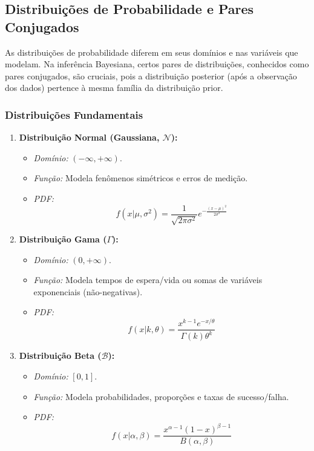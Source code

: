 \documentclass{article}
\begin{document}
\subsection{Distribuições de Probabilidade e Pares Conjugados}

As distribuições de probabilidade diferem em seus domínios e nas variáveis que modelam. Na inferência Bayesiana, certos pares de distribuições, conhecidos como pares conjugados, são cruciais, pois a distribuição posterior (após a observação dos dados) pertence à mesma família da distribuição prior.

\subsubsection{Distribuições Fundamentais}

\begin{enumerate}
	\item \textbf{Distribuição Normal (Gaussiana, $\mathcal{N}$):}
	\begin{itemize}
		\item \textit{Domínio:} $(-\infty, +\infty)$.
		\item \textit{Função:} Modela fenômenos simétricos e erros de medição.
		\item \textit{PDF:} $$f(x|\mu, \sigma^2) = \frac{1}{\sqrt{2\pi\sigma^2}} e^{-\frac{(x-\mu)^2}{2\sigma^2}}$$
	\end{itemize}
	
	\item \textbf{Distribuição Gama ($\Gamma$):}
	\begin{itemize}
		\item \textit{Domínio:} $(0, +\infty)$.
		\item \textit{Função:} Modela tempos de espera/vida ou somas de variáveis exponenciais (não-negativas).
		\item \textit{PDF:} $$f(x|k, \theta) = \frac{x^{k-1}e^{-x/\theta}}{\Gamma(k)\theta^k}$$
	\end{itemize}
	
	\item \textbf{Distribuição Beta ($\mathcal{B}$):}
	\begin{itemize}
		\item \textit{Domínio:} $[0, 1]$.
		\item \textit{Função:} Modela probabilidades, proporções e taxas de sucesso/falha.
		\item \textit{PDF:} $$f(x|\alpha, \beta) = \frac{x^{\alpha-1}(1-x)^{\beta-1}}{B(\alpha, \beta)}$$
	\end{itemize}
\end{enumerate}
\end{document}
